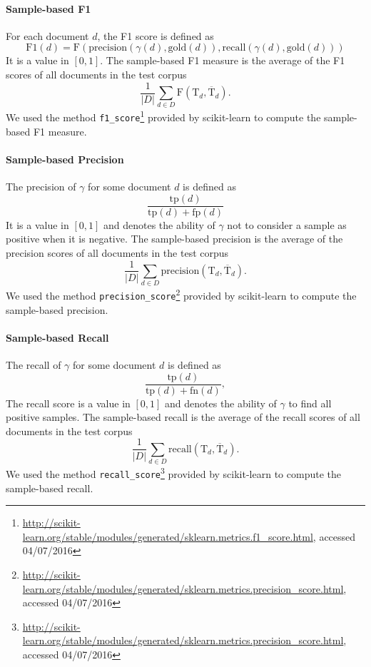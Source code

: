 \documentclass{article}
\begin{document}
\paragraph{Sample-based F1}
For each document $d$, the F1 score is defined as
\begin{equation*}
\mathrm{F1}(d) =  \mathrm{F}(\mathrm{precision}(\gamma(d),\mathrm{gold}(d)),\mathrm{recall}(\gamma(d),\mathrm{gold}(d)))
\end{equation*}
It is a value in $[0,1]$. The sample-based F1 measure is the average of the F1 scores of all documents in the test corpus
\begin{equation*}
\frac{1}{|D|} \sum\limits_{d \in D} \mathrm{F}(\mathrm{T}_{d},\overline{\mathrm{T}}_{d}).
\end{equation*}
We used the method \texttt{f1\_score}\footnote{
  \url{http://scikit-learn.org/stable/modules/generated/sklearn.metrics.f1_score.html}, accessed 04/07/2016} provided by scikit-learn
to compute the sample-based F1 measure.

\paragraph{Sample-based Precision}
The precision of $\gamma$ for some document $d$ is defined as
\begin{equation*}
\frac{\mathrm{tp}(d)}{\mathrm{tp}(d) + \mathrm{fp}(d)}
\end{equation*}
It is a value in $[0,1]$ and denotes the ability of $\gamma$ not to consider a sample as positive when it is negative. The sample-based
precision is the average of the precision scores of all documents in the test corpus
\begin{equation*}
\frac{1}{|D|} \sum\limits_{d \in D} \mathrm{precision}(\mathrm{T}_{d},\overline{\mathrm{T}}_{d}).
\end{equation*}
We used the method \texttt{precision\_score}\footnote{
  \url{http://scikit-learn.org/stable/modules/generated/sklearn.metrics.precision_score.html}, accessed 04/07/2016} provided by scikit-learn
to compute the sample-based precision.

\paragraph{Sample-based Recall}
The recall of $\gamma$ for some document $d$ is defined as
\begin{equation*}
\frac{\mathrm{tp}(d)}{\mathrm{tp}(d) + \mathrm{fn}(d)},
\end{equation*}
The recall score is a value in $[0,1]$ and denotes the ability of $\gamma$ to find all positive samples. The sample-based recall is the average of
the recall scores of all documents in the test corpus
\begin{equation*}
\frac{1}{|D|} \sum\limits_{d \in D} \mathrm{recall}(\mathrm{T}_{d},\overline{\mathrm{T}}_{d}).
\end{equation*}
We used the method \texttt{recall\_score}\footnote{
  \url{http://scikit-learn.org/stable/modules/generated/sklearn.metrics.precision_score.html}, accessed 04/07/2016} provided by scikit-learn
to compute the sample-based recall.
\end{document}
